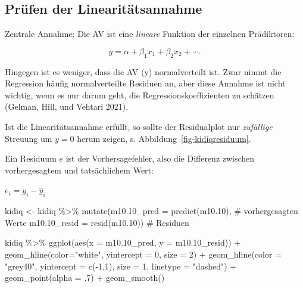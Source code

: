\documentclass[
  a4paper,
  DIV=11]{scrreprt}
\newenvironment{Shaded}{\begin{snugshade}}{\end{snugshade}}
\newcommand{\AttributeTok}[1]{\textcolor[rgb]{0.40,0.45,0.13}{#1}}
\newcommand{\CommentTok}[1]{\textcolor[rgb]{0.37,0.37,0.37}{#1}}
\newcommand{\DecValTok}[1]{\textcolor[rgb]{0.68,0.00,0.00}{#1}}
\newcommand{\FloatTok}[1]{\textcolor[rgb]{0.68,0.00,0.00}{#1}}
\newcommand{\FunctionTok}[1]{\textcolor[rgb]{0.28,0.35,0.67}{#1}}
\newcommand{\NormalTok}[1]{\textcolor[rgb]{0.00,0.23,0.31}{#1}}
\newcommand{\OtherTok}[1]{\textcolor[rgb]{0.00,0.23,0.31}{#1}}
\newcommand{\SpecialCharTok}[1]{\textcolor[rgb]{0.37,0.37,0.37}{#1}}
\newcommand{\StringTok}[1]{\textcolor[rgb]{0.13,0.47,0.30}{#1}}
\theoremstyle{definition}
\theoremstyle{remark}
\begin{document}
\hypertarget{pruxfcfen-der-linearituxe4tsannahme}{%
\subsection{Prüfen der
Linearitätsannahme}\label{pruxfcfen-der-linearituxe4tsannahme}}

Zentrale Annahme: Die AV ist eine \emph{lineare} Funktion der einzelnen
Prädiktoren:

\[y= \alpha + \beta_1x_1 + \beta_2 x_2 + \cdots .\]

Hingegen ist es weniger, dass die AV (y) normalverteilt ist. Zwar nimmt
die Regression häufig normalverteilte Residuen an, aber diese Annahme
ist nicht wichtig, wenn es nur darum geht, die Regressionskoeffizienten
zu schätzen (Gelman, Hill, und Vehtari 2021).

Ist die Linearitätsannahme erfüllt, so sollte der Residualplot nur
\emph{zufällige} Streuung um \(y=0\) herum zeigen, s.
Abbildung~\ref{fig-kidiqresiduum}.

Ein Residuum \(e\) ist der Vorhersagefehler, also die Differenz zwischen
vorhergesagtem und tatsächlichem Wert:

\(e_i = y_i - \hat{y}_i\)

\begin{Shaded}
\begin{Highlighting}[]
\NormalTok{kidiq }\OtherTok{\textless{}{-}}
\NormalTok{  kidiq }\SpecialCharTok{\%\textgreater{}\%} 
  \FunctionTok{mutate}\NormalTok{(}\AttributeTok{m10.10\_pred =} \FunctionTok{predict}\NormalTok{(m10}\FloatTok{.10}\NormalTok{),  }\CommentTok{\# vorhergesagten Werte}
         \AttributeTok{m10.10\_resid =} \FunctionTok{resid}\NormalTok{(m10}\FloatTok{.10}\NormalTok{))  }\CommentTok{\# Residuen}
\end{Highlighting}
\end{Shaded}

\begin{Shaded}
\begin{Highlighting}[]
\NormalTok{kidiq }\SpecialCharTok{\%\textgreater{}\%} 
  \FunctionTok{ggplot}\NormalTok{(}\FunctionTok{aes}\NormalTok{(}\AttributeTok{x =}\NormalTok{ m10}\FloatTok{.10}\NormalTok{\_pred, }\AttributeTok{y =}\NormalTok{ m10}\FloatTok{.10}\NormalTok{\_resid)) }\SpecialCharTok{+}
  \FunctionTok{geom\_hline}\NormalTok{(}\AttributeTok{color=}\StringTok{"white"}\NormalTok{, }\AttributeTok{yintercept =} \DecValTok{0}\NormalTok{, }\AttributeTok{size =} \DecValTok{2}\NormalTok{) }\SpecialCharTok{+}
  \FunctionTok{geom\_hline}\NormalTok{(}\AttributeTok{color =} \StringTok{"grey40"}\NormalTok{, }
             \AttributeTok{yintercept =} \FunctionTok{c}\NormalTok{(}\SpecialCharTok{{-}}\DecValTok{1}\NormalTok{,}\DecValTok{1}\NormalTok{), }
             \AttributeTok{size =} \DecValTok{1}\NormalTok{, }
             \AttributeTok{linetype =} \StringTok{"dashed"}\NormalTok{) }\SpecialCharTok{+}
  \FunctionTok{geom\_point}\NormalTok{(}\AttributeTok{alpha =}\NormalTok{ .}\DecValTok{7}\NormalTok{) }\SpecialCharTok{+}
  \FunctionTok{geom\_smooth}\NormalTok{()}
\end{Highlighting}
\end{Shaded}
\end{document}
